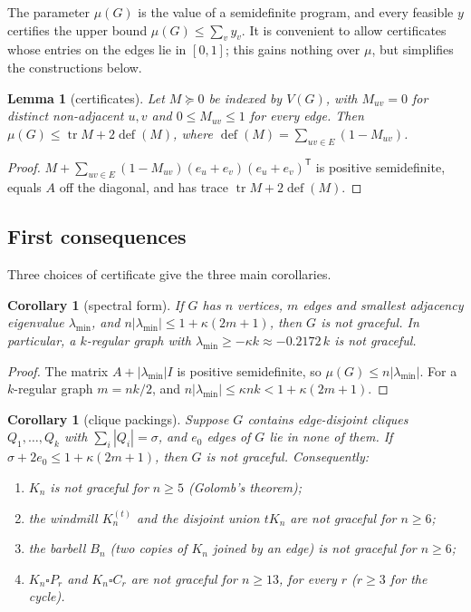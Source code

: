 \documentclass[11pt]{amsart}
\newcommand{\thmmarker}{}
\newcommand{\mnew}{\gdef\thmmarker{\textsuperscript{$\star$}}}
\theoremstyle{tplain}
\newtheorem{lemma}[theorem]{Lemma}
\newtheorem{corollary}[theorem]{Corollary}
\theoremstyle{tdefinition}
\theoremstyle{tremark}
\newcommand{\lmin}{\lambda_{\min}}
\newcommand{\tr}{\operatorname{tr}}
\begin{document}
The parameter $\mu(G)$ is the value of a semidefinite program, and every
feasible $y$ certifies the upper bound $\mu(G)\le\sum_vy_v$. It is convenient to allow certificates whose entries on the
edges lie in $[0,1]$; this gains nothing over $\mu$, but simplifies the
constructions below.

\begin{lemma}[certificates]\label{lem:cert}
Let $M\succeq0$ be indexed by $V(G)$, with $M_{uv}=0$ for distinct
non-adjacent $u,v$ and $0\le M_{uv}\le1$ for every edge. Then
$\mu(G)\le\tr M+2\operatorname{def}(M)$, where $\operatorname{def}(M)=\sum_{uv\in E}(1-M_{uv})$.
\end{lemma}

\begin{proof}
$M+\sum_{uv\in E}(1-M_{uv})(e_u+e_v)(e_u+e_v)^{\mathsf T}$ is positive
semidefinite, equals $A$ off the diagonal, and has trace
$\tr M+2\operatorname{def}(M)$.
\end{proof}

\subsection{First consequences}

Three choices of certificate give the three main corollaries.

\mnew\begin{corollary}[spectral form]\label{cor:spectral}
If $G$ has $n$ vertices, $m$ edges and smallest adjacency eigenvalue $\lmin$,
and $n|\lmin|\le1+\kappa(2m+1)$, then $G$ is not graceful. In particular, a
$k$-regular graph with $\lmin\ge-\kappa k\approx-0.2172\,k$ is not graceful.
\end{corollary}

\begin{proof}
The matrix $A+|\lmin|I$ is positive semidefinite, so
$\mu(G)\le n|\lmin|$. For a $k$-regular graph $m=nk/2$, and
$n|\lmin|\le\kappa nk<1+\kappa(2m+1)$.
\end{proof}

\begin{corollary}[clique packings]\label{cor:cliques}
Suppose $G$ contains edge-disjoint cliques $Q_1,\dots,Q_k$ with
$\sum_i|Q_i|=\sigma$, and $e_0$ edges of $G$ lie in none of them. If
$\sigma+2e_0\le1+\kappa(2m+1)$, then $G$ is not graceful. Consequently:
\begin{enumerate}[label=(\alph*)]
\item $K_n$ is not graceful for $n\ge5$ (Golomb's theorem);
\item the windmill $K_n^{(t)}$ and the disjoint union $tK_n$ are not graceful
  for $n\ge6$;
\item the barbell $B_n$ (two copies of $K_n$ joined by an edge) is not
  graceful for $n\ge6$;
\item $K_n\square P_r$ and $K_n\square C_r$ are not graceful for $n\ge13$,
  for every $r$ ($r\ge3$ for the cycle).
\end{enumerate}
\end{corollary}
\end{document}
